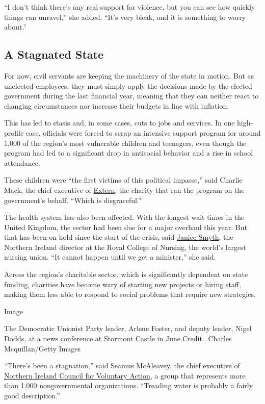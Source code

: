 ``I don't think there's any real support for violence, but you can see
how quickly things can unravel,'' she added. ``It's very bleak, and it
is something to worry about.''

\hypertarget{a-stagnated-state}{%
\subsection{A Stagnated State}\label{a-stagnated-state}}

For now, civil servants are keeping the machinery of the state in
motion. But as unelected employees, they must simply apply the decisions
made by the elected government during the last financial year, meaning
that they can neither react to changing circumstances nor increase their
budgets in line with inflation.

This has led to stasis and, in some cases, cuts to jobs and services. In
one high-profile case, officials were forced to scrap an intensive
support program for around 1,000 of the region's most vulnerable
children and teenagers, even though the program had led to a significant
drop in antisocial behavior and a rise in school attendance.

These children were ``the first victims of this political impasse,''
said Charlie Mack, the chief executive of
\href{http://www.extern.org/}{Extern}, the charity that ran the program
on the government's behalf. ``Which is disgraceful.''

The health system has also been affected. With the longest wait times in
the United Kingdom, the sector had been due for a major overhaul this
year. But that has been on hold since the start of the crisis, said
\href{https://www.rcn.org.uk/about-us/our-structure/rcn-executive-team}{Janice
Smyth}, the Northern Ireland director at the Royal College of Nursing,
the world's largest nursing union. ``It cannot happen until we get a
minister,'' she said.

Across the region's charitable sector, which is significantly dependent
on state funding, charities have become wary of starting new projects or
hiring staff, making them less able to respond to social problems that
require new strategies.

Image

The Democratic Unionist Party leader, Arlene Foster, and deputy leader,
Nigel Dodds, at a news conference at Stormont Castle in
June.Credit...Charles Mcquillan/Getty Images

``There's been a stagnation,'' said Seamus McAleavey, the chief
executive of \href{http://www.nicva.org/about-us}{Northern Ireland
Council for Voluntary Action}, a group that represents more than 1,000
nongovernmental organizations. ``Treading water is probably a fairly
good description.''

